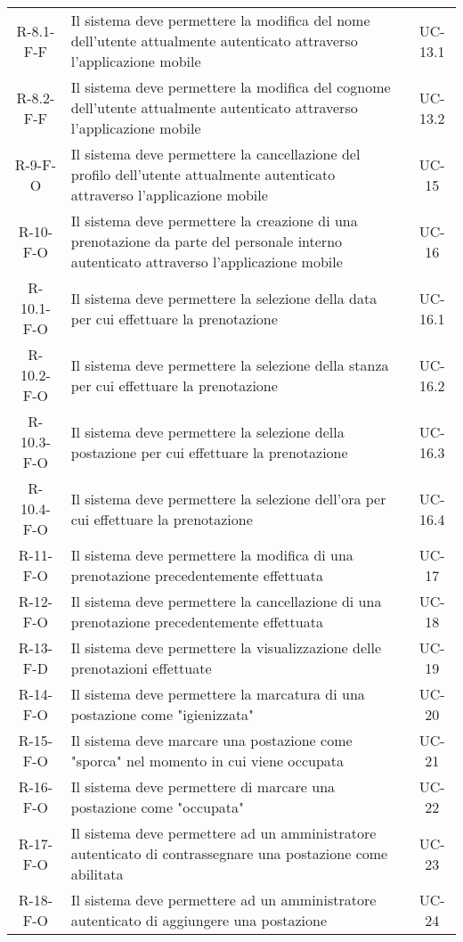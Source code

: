 \begin{longtable}{ c C{9cm} c }
    R-8.1-F-F & Il sistema deve permettere la modifica del nome dell'utente attualmente autenticato attraverso l'applicazione mobile & UC-13.1 \\
    R-8.2-F-F & Il sistema deve permettere la modifica del cognome dell'utente attualmente autenticato attraverso l'applicazione mobile & UC-13.2 \\
    R-9-F-O & Il sistema deve permettere la cancellazione del profilo dell'utente attualmente autenticato attraverso l'applicazione mobile & UC-15 \\
    R-10-F-O & Il sistema deve permettere la creazione di una prenotazione da parte del personale interno autenticato attraverso l'applicazione mobile & UC-16 \\
    R-10.1-F-O & Il sistema deve permettere la selezione della data per cui effettuare la prenotazione & UC-16.1 \\
    R-10.2-F-O & Il sistema deve permettere la selezione della stanza per cui effettuare la prenotazione & UC-16.2 \\
    R-10.3-F-O & Il sistema deve permettere la selezione della postazione per cui effettuare la prenotazione & UC-16.3 \\
    R-10.4-F-O & Il sistema deve permettere la selezione dell'ora per cui effettuare la prenotazione & UC-16.4 \\
    R-11-F-O & Il sistema deve permettere la modifica di una prenotazione precedentemente effettuata & UC-17 \\
    R-12-F-O & Il sistema deve permettere la cancellazione di una prenotazione precedentemente effettuata & UC-18 \\
    R-13-F-D & Il sistema deve permettere la visualizzazione delle prenotazioni effettuate & UC-19 \\
    R-14-F-O & Il sistema deve permettere la marcatura di una postazione come "igienizzata" & UC-20 \\
    R-15-F-O & Il sistema deve marcare una postazione come "sporca" nel momento in cui viene occupata & UC-21 \\
    R-16-F-O & Il sistema deve permettere di marcare una postazione come "occupata" & UC-22 \\
    R-17-F-O & Il sistema deve permettere ad un amministratore autenticato di contrassegnare una postazione come abilitata & UC-23 \\
    R-18-F-O & Il sistema deve permettere ad un amministratore autenticato di aggiungere una postazione & UC-24 \\

\end{longtable}
